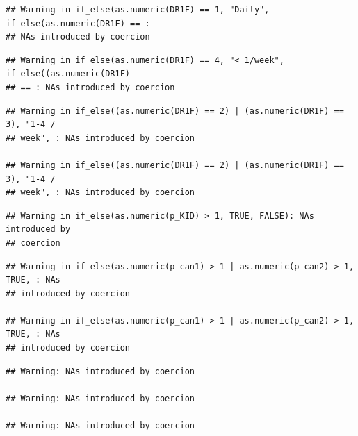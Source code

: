 \documentclass[]{article}
\newenvironment{Shaded}{\begin{snugshade}}{\end{snugshade}}
\newcommand{\DataTypeTok}[1]{\textcolor[rgb]{0.13,0.29,0.53}{#1}}
\newcommand{\DecValTok}[1]{\textcolor[rgb]{0.00,0.00,0.81}{#1}}
\newcommand{\KeywordTok}[1]{\textcolor[rgb]{0.13,0.29,0.53}{\textbf{#1}}}
\newcommand{\NormalTok}[1]{#1}
\newcommand{\OperatorTok}[1]{\textcolor[rgb]{0.81,0.36,0.00}{\textbf{#1}}}
\newcommand{\OtherTok}[1]{\textcolor[rgb]{0.56,0.35,0.01}{#1}}
\newcommand{\StringTok}[1]{\textcolor[rgb]{0.31,0.60,0.02}{#1}}
\begin{document}
\begin{verbatim}
## Warning in if_else(as.numeric(DR1F) == 1, "Daily", if_else(as.numeric(DR1F) == :
## NAs introduced by coercion
\end{verbatim}

\begin{verbatim}
## Warning in if_else(as.numeric(DR1F) == 4, "< 1/week", if_else((as.numeric(DR1F)
## == : NAs introduced by coercion
\end{verbatim}

\begin{verbatim}
## Warning in if_else((as.numeric(DR1F) == 2) | (as.numeric(DR1F) == 3), "1-4 /
## week", : NAs introduced by coercion

## Warning in if_else((as.numeric(DR1F) == 2) | (as.numeric(DR1F) == 3), "1-4 /
## week", : NAs introduced by coercion
\end{verbatim}

\begin{verbatim}
## Warning in if_else(as.numeric(p_KID) > 1, TRUE, FALSE): NAs introduced by
## coercion
\end{verbatim}

\begin{verbatim}
## Warning in if_else(as.numeric(p_can1) > 1 | as.numeric(p_can2) > 1, TRUE, : NAs
## introduced by coercion

## Warning in if_else(as.numeric(p_can1) > 1 | as.numeric(p_can2) > 1, TRUE, : NAs
## introduced by coercion
\end{verbatim}

\begin{verbatim}
## Warning: NAs introduced by coercion

## Warning: NAs introduced by coercion

## Warning: NAs introduced by coercion
\end{verbatim}

\begin{Shaded}
\end{Shaded}
\end{document}
